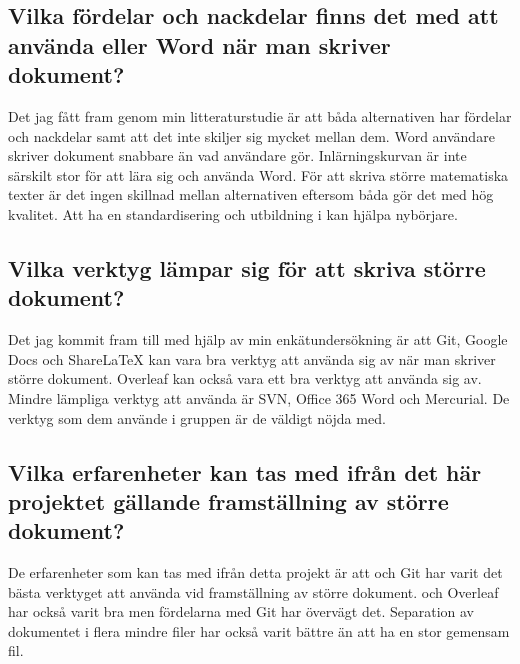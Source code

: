 \subsection{Vilka fördelar och nackdelar finns det med att använda \latex eller Word när man skriver dokument?}
Det jag fått fram genom min litteraturstudie är att båda alternativen har fördelar och nackdelar samt att det inte skiljer sig mycket mellan dem. Word användare skriver dokument snabbare än vad \latex användare gör. Inlärningskurvan är inte särskilt stor för att lära sig och använda Word. För att skriva större matematiska texter är det ingen skillnad mellan alternativen eftersom båda gör det med hög kvalitet. Att ha en standardisering och utbildning i \latex kan hjälpa nybörjare.

\subsection{Vilka verktyg lämpar sig för att skriva större dokument?}
Det jag kommit fram till med hjälp av min enkätundersökning är att Git, Google Docs och ShareLaTeX kan vara bra verktyg att använda sig av när man skriver större dokument. Overleaf kan också vara ett bra verktyg att använda sig av. Mindre lämpliga verktyg att använda är SVN, Office 365 Word och Mercurial. De verktyg som dem använde i gruppen är de väldigt nöjda med.

\subsection{Vilka erfarenheter kan tas med ifrån det här projektet gällande framställning av större dokument?}
De erfarenheter som kan tas med ifrån detta projekt är att \latex och Git har varit det bästa verktyget att använda vid framställning av större dokument. \latex och Overleaf har också varit bra men fördelarna med Git har övervägt det. Separation av dokumentet i flera mindre filer har också varit bättre än att ha en stor gemensam fil.


